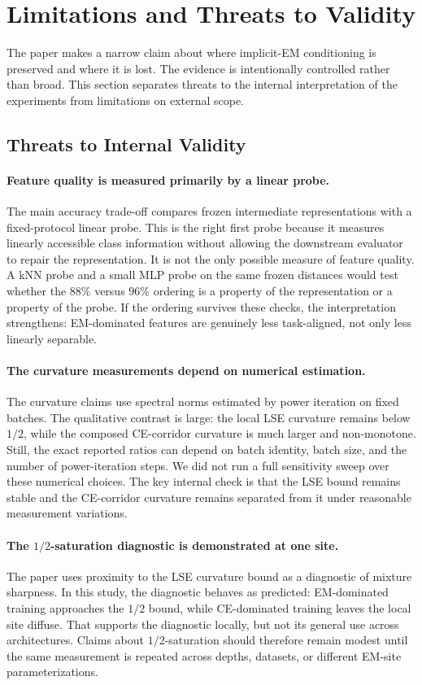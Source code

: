 \section{Limitations and Threats to Validity}
\label{sec:limitations}
The paper makes a narrow claim about where implicit-EM conditioning is
preserved and where it is lost. The evidence is intentionally controlled
rather than broad. This section separates threats to the internal
interpretation of the experiments from limitations on external scope.

\subsection{Threats to Internal Validity}
\paragraph{Feature quality is measured primarily by a linear probe.}
The main accuracy trade-off compares frozen intermediate representations with
a fixed-protocol linear probe. This is the right first probe because it
measures linearly accessible class information without allowing the downstream
evaluator to repair the representation. It is not the only possible measure of
feature quality. A kNN probe and a small MLP probe on the same frozen
distances would test whether the $88\%$ versus $96\%$ ordering is a property
of the representation or a property of the probe. If the ordering survives
these checks, the interpretation strengthens: EM-dominated features are
genuinely less task-aligned, not only less linearly separable.

\paragraph{The curvature measurements depend on numerical estimation.}
The curvature claims use spectral norms estimated by power iteration on fixed
batches. The qualitative contrast is large: the local LSE curvature remains
below $1/2$, while the composed CE-corridor curvature is much larger and
non-monotone. Still, the exact reported ratios can depend on batch identity,
batch size, and the number of power-iteration steps. We did not run a full
sensitivity sweep over these numerical choices. The key internal check is that
the LSE bound remains stable and the CE-corridor curvature remains separated
from it under reasonable measurement variations.

\paragraph{The $1/2$-saturation diagnostic is demonstrated at one site.}
The paper uses proximity to the LSE curvature bound as a diagnostic of mixture
sharpness. In this study, the diagnostic behaves as predicted: EM-dominated
training approaches the $1/2$ bound, while CE-dominated training leaves the
local site diffuse. That supports the diagnostic locally, but not its general
use across architectures. Claims about $1/2$-saturation should therefore
remain modest until the same measurement is repeated across depths, datasets,
or different EM-site parameterizations.

